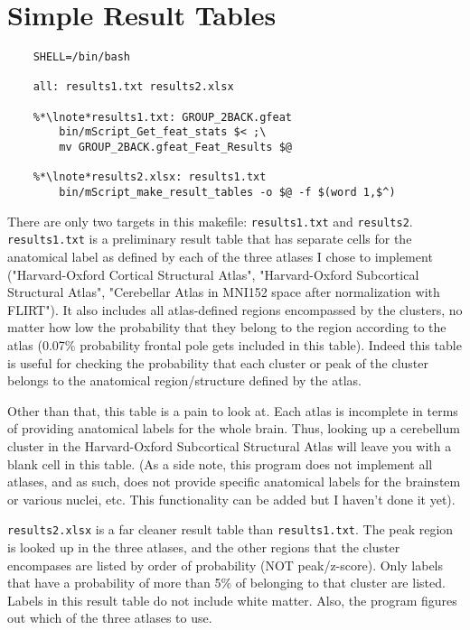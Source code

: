 \section{Simple Result Tables}
\begin{lstlisting}
	SHELL=/bin/bash

	all: results1.txt results2.xlsx
  
	%*\lnote*results1.txt: GROUP_2BACK.gfeat
		bin/mScript_Get_feat_stats $< ;\
		mv GROUP_2BACK.gfeat_Feat_Results $@

	%*\lnote*results2.xlsx: results1.txt
		bin/mScript_make_result_tables -o $@ -f $(word 1,$^)

\end{lstlisting}

There are only two targets in this makefile: \texttt{results1.txt} and \texttt{results2}.
\lnum{1} \texttt{results1.txt} is a preliminary result table that has separate cells for the anatomical label as defined by each of the three atlases I chose to implement ("Harvard-Oxford Cortical Structural Atlas", "Harvard-Oxford Subcortical Structural Atlas", "Cerebellar Atlas in MNI152 space after normalization with FLIRT"). It also includes all atlas-defined regions encompassed by the clusters, no matter how low the probability that they belong to the region according to the atlas (0.07\% probability frontal pole gets included in this table). Indeed this table is useful for checking the probability that each cluster or peak of the cluster belongs to the anatomical region/structure defined by the atlas. 

Other than that, this table is a pain to look at. Each atlas is incomplete in terms of providing anatomical labels for the whole brain. Thus, looking up a cerebellum cluster in the Harvard-Oxford Subcortical Structural Atlas will leave you with a blank cell in this table. (As a side note, this program does not implement all atlases, and as such, does not provide specific anatomical labels for the brainstem or various nuclei, etc. This functionality can be added but I haven't done it yet).

\texttt{results2.xlsx} is a far cleaner result table than \texttt{results1.txt}. The peak region is looked up in the three atlases, and the other regions that the cluster encompases are listed by order of probability (NOT peak/z-score). Only labels that have a probability of more than 5\% of belonging to that cluster are listed. Labels in this result table do not include white matter. Also, the program figures out which of the three atlases to use.

